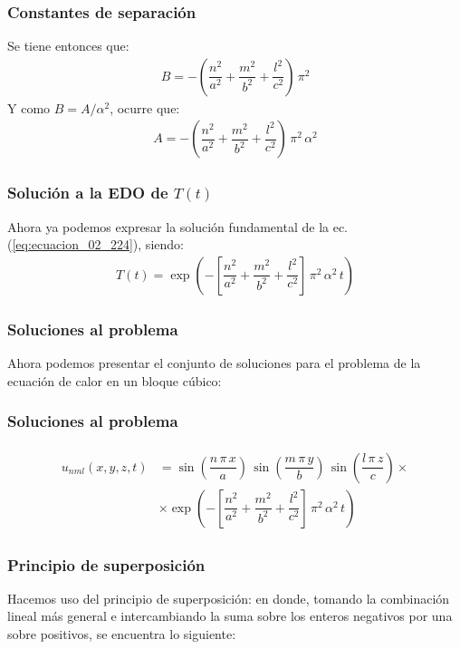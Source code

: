 \begin{frame}
\frametitle{Constantes de separación}
Se tiene entonces que:
\begin{align*}
B = - \left( \dfrac{n^{2}}{a^{2}} + \dfrac{m^{2}}{b^{2}} + \dfrac{l^{2}}{c^{2}} \right) \, \pi^{2}
\end{align*}
\pause
Y como $B = A / \alpha^{2}$, ocurre que:
\pause
\begin{align}
A = - \left( \dfrac{n^{2}}{a^{2}} + \dfrac{m^{2}}{b^{2}} + \dfrac{l^{2}}{c^{2}} \right) \, \pi^{2} \, \alpha^{2}
\label{eq:ecuacion_02_237}
\end{align}
\end{frame}
\begin{frame}
\frametitle{Solución a la EDO de $T(t)$}
Ahora ya podemos expresar la solución fundamental de la ec. (\ref{eq:ecuacion_02_224}), siendo:
\begin{align}
T(t) = \exp \left( - \left[ \dfrac{n^{2}}{a^{2}} + \dfrac{m^{2}}{b^{2}} + \dfrac{l^{2}}{c^{2}} \right] \, \pi^{2} \, \alpha^{2}\, t \right)
\label{eq:ecuacion_02_238}
\end{align}
\end{frame}
\begin{frame}
\frametitle{Soluciones al problema}
Ahora podemos presentar el conjunto de soluciones para el problema de la ecuación de calor en un bloque cúbico:
\end{frame}
\begin{frame}
\frametitle{Soluciones al problema}
\begin{align}
\begin{aligned}
u_{nml}(x, y, z, t) &= \sin \left(\dfrac{n \, \pi \, x}{a} \right) \, \sin \left( \dfrac{m \, \pi \, y}{b} \right) \, \sin \left( \dfrac{l \, \pi \, z}{c} \right) \times \\[1em]
&\times \exp \left( - \left[ \dfrac{n^{2}}{a^{2}} + \dfrac{m^{2}}{b^{2}} + \dfrac{l^{2}}{c^{2}} \right] \, \pi^{2} \, \alpha^{2}\, t \right)
\end{aligned}
\label{eq:ecuacion_02_239}
\end{align}
\end{frame}
\begin{frame}
\frametitle{Principio de superposición}
Hacemos uso del principio de superposición: en donde, tomando la combinación lineal más general e intercambiando la suma sobre los enteros negativos por una sobre positivos, se encuentra lo siguiente:
\end{frame}
